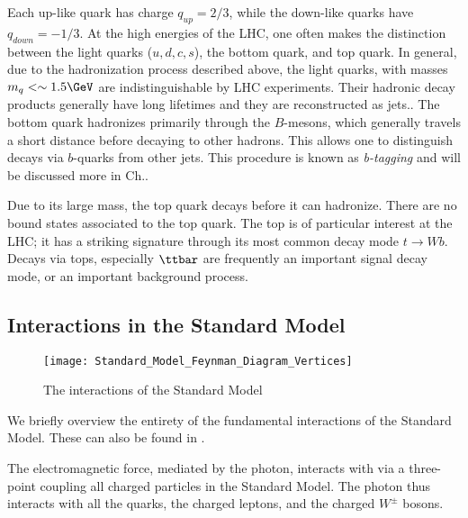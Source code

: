 Each up-like quark has charge $q_{up} = 2/3$, while the down-like quarks have $q_{down} = -1/3$.
At the high energies of the LHC, one often makes the distinction between the light quarks ($u,d,c,s$), the bottom quark, and top quark.
In general, due to the hadronization process described above, the light quarks, with masses $m_q <\order 1.5 \GeV$ are indistinguishable by LHC experiments.
Their hadronic decay products generally have long lifetimes and they are reconstructed as jets.\footnotemark.
The bottom quark hadronizes primarily through the $B$-mesons, which generally travels a short distance before decaying to other hadrons.
This allows one to distinguish decays via $b$-quarks from other jets.
This procedure is known as \textit{b-tagging} and will be discussed more in Ch..

Due to its large mass, the top quark decays before it can hadronize.
There are no bound states associated to the top quark.
The top is of particular interest at the LHC; it has a striking signature through its most common decay mode $t \rightarrow Wb$.
Decays via tops, especially $\ttbar$ are frequently an important signal decay mode, or an important background process.

\subsection{Interactions in the Standard Model}
\begin{figure}
\caption{The interactions of the Standard Model} \label{fig:sm_interactions}
\texttt{[image: Standard\_Model\_Feynman\_Diagram\_Vertices]}
\end{figure}

We briefly overview the entirety of the fundamental interactions of the Standard Model.
These can also be found in .

The electromagnetic force, mediated by the photon, interacts with via a three-point coupling all charged particles in the Standard Model.
The photon thus interacts with all the quarks, the charged leptons, and the charged $W^\pm$ bosons.

